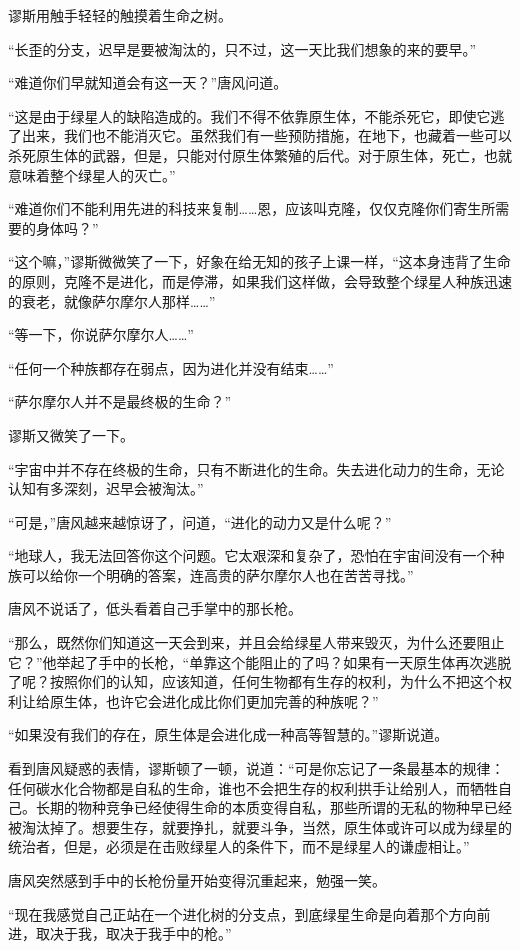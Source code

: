 谬斯用触手轻轻的触摸着生命之树。

“长歪的分支，迟早是要被淘汰的，只不过，这一天比我们想象的来的要早。”

“难道你们早就知道会有这一天？”唐风问道。

“这是由于绿星人的缺陷造成的。我们不得不依靠原生体，不能杀死它，即使它逃了出来，我们也不能消灭它。虽然我们有一些预防措施，在地下，也藏着一些可以杀死原生体的武器，但是，只能对付原生体繁殖的后代。对于原生体，死亡，也就意味着整个绿星人的灭亡。”

“难道你们不能利用先进的科技来复制……恩，应该叫克隆，仅仅克隆你们寄生所需要的身体吗？”

“这个嘛，”谬斯微微笑了一下，好象在给无知的孩子上课一样，“这本身违背了生命的原则，克隆不是进化，而是停滞，如果我们这样做，会导致整个绿星人种族迅速的衰老，就像萨尔摩尔人那样……”

“等一下，你说萨尔摩尔人……”

“任何一个种族都存在弱点，因为进化并没有结束……”

“萨尔摩尔人并不是最终极的生命？”

谬斯又微笑了一下。

“宇宙中并不存在终极的生命，只有不断进化的生命。失去进化动力的生命，无论认知有多深刻，迟早会被淘汰。”

“可是，”唐风越来越惊讶了，问道，“进化的动力又是什么呢？”

“地球人，我无法回答你这个问题。它太艰深和复杂了，恐怕在宇宙间没有一个种族可以给你一个明确的答案，连高贵的萨尔摩尔人也在苦苦寻找。”

唐风不说话了，低头看着自己手掌中的那长枪。

“那么，既然你们知道这一天会到来，并且会给绿星人带来毁灭，为什么还要阻止它？”他举起了手中的长枪，“单靠这个能阻止的了吗？如果有一天原生体再次逃脱了呢？按照你们的认知，应该知道，任何生物都有生存的权利，为什么不把这个权利让给原生体，也许它会进化成比你们更加完善的种族呢？”

“如果没有我们的存在，原生体是会进化成一种高等智慧的。”谬斯说道。

看到唐风疑惑的表情，谬斯顿了一顿，说道：“可是你忘记了一条最基本的规律：任何碳水化合物都是自私的生命，谁也不会把生存的权利拱手让给别人，而牺牲自己。长期的物种竞争已经使得生命的本质变得自私，那些所谓的无私的物种早已经被淘汰掉了。想要生存，就要挣扎，就要斗争，当然，原生体或许可以成为绿星的统治者，但是，必须是在击败绿星人的条件下，而不是绿星人的谦虚相让。”

唐风突然感到手中的长枪份量开始变得沉重起来，勉强一笑。

“现在我感觉自己正站在一个进化树的分支点，到底绿星生命是向着那个方向前进，取决于我，取决于我手中的枪。”

